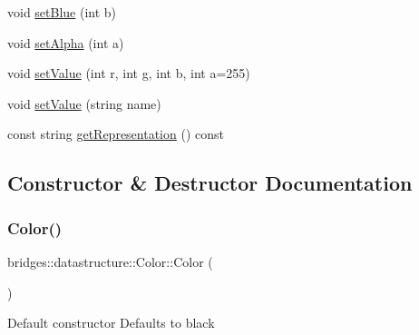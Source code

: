 \begin{DoxyCompactItemize}
\item 
void \hyperlink{classbridges_1_1datastructure_1_1_color_a829b0b914125ee30ce3d3e45a52a45c1}{set\+Blue} (int b)
\item 
void \hyperlink{classbridges_1_1datastructure_1_1_color_a19ff34702143ec54248438dfad02e4a2}{set\+Alpha} (int a)
\item 
void \hyperlink{classbridges_1_1datastructure_1_1_color_aa23d4b981b994b4065f904195ffd8595}{set\+Value} (int r, int g, int b, int a=255)
\item 
void \hyperlink{classbridges_1_1datastructure_1_1_color_ad6c95830bb6d69d39624f3989127aa93}{set\+Value} (string name)
\item 
const string \hyperlink{classbridges_1_1datastructure_1_1_color_a2ebb4e803c935cf151e3309700f3978d}{get\+Representation} () const
\end{DoxyCompactItemize}


\subsection{Constructor \& Destructor Documentation}
\mbox{\label{classbridges_1_1datastructure_1_1_color_ad6b8b6b89a54ebea80d211679e10be3e}} 
\subsubsection{\texorpdfstring{Color()}{Color()}\hspace{0.1cm}{\footnotesize\ttfamily [1/3]}}
{\footnotesize\ttfamily bridges\+::datastructure\+::\+Color\+::\+Color (\begin{DoxyParamCaption}{ }\end{DoxyParamCaption})\hspace{0.3cm}{\ttfamily [inline]}}

Default constructor Defaults to black \mbox{\label{classbridges_1_1datastructure_1_1_color_a0b746741c261fdc010adab62bbdb862c}} 
